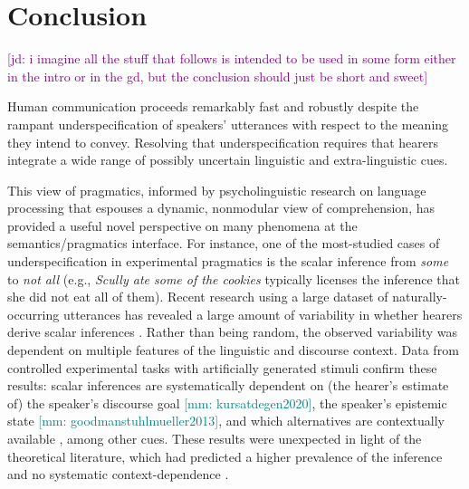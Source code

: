 \documentclass[12pt,letterpaper,table,svgnames,dvipsnames]{article}
\newcommand{\jd}[1]{\textcolor{Purple}{[jd: #1]}}
\newcommand{\mm}[1]{\textcolor{teal}{[mm: #1]}}
\begin{document}
\section{Conclusion}

\jd{i imagine all the stuff that follows is intended to be used in some form either in the intro or in the gd, but the conclusion should just be short and sweet}

Human communication proceeds remarkably fast and robustly despite the rampant underspecification of speakers' utterances with respect to the meaning they intend to convey. Resolving that underspecification requires that hearers integrate a wide range of possibly uncertain linguistic and extra-linguistic cues. 

This view of pragmatics, informed by psycholinguistic research on language processing that espouses a dynamic, nonmodular view of comprehension, has provided a useful novel perspective on many phenomena at the semantics/pragmatics interface. For instance, one of the most-studied cases of underspecification in experimental pragmatics is the scalar inference from \emph{some} to \emph{not all} (e.g., \emph{Scully ate some of the cookies} typically licenses the inference that she did not eat all of them). Recent research using a large dataset of naturally-occurring utterances has revealed a large amount of variability in whether hearers derive scalar inferences \cite{degen2015}. Rather than being random, the observed variability was dependent on multiple features of the linguistic and discourse context. Data from controlled experimental tasks with artificially generated stimuli confirm these results: scalar inferences are systematically dependent on (the hearer's estimate of) the speaker's discourse goal \cite{zondervan2010}\mm{kursatdegen2020}, the speaker's epistemic state \mm{goodmanstuhlmueller2013}\cite{brehenyetal2013}, and which alternatives are contextually available \cite{huangsnedeker2011,degentanenhaus2016}, among other cues. These results were unexpected in light of the theoretical literature, which had predicted a higher prevalence of the inference and no systematic context-dependence \cite{levinson2000}.
\end{document}
